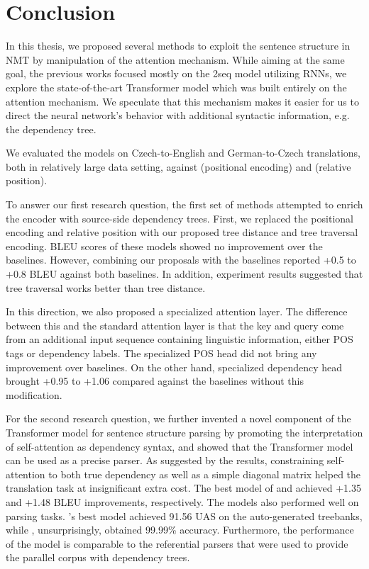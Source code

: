 \chapter{Conclusion}

In this thesis, we proposed several methods to exploit the sentence structure in NMT by manipulation of the attention mechanism.
While aiming at the same goal, the previous works focused mostly on the \seq2seq model utilizing RNNs, we explore the state-of-the-art Transformer model which was built entirely on the attention mechanism.
We speculate that this mechanism makes it easier for us to direct the neural network's behavior with additional syntactic information, e.g. the dependency tree.

We evaluated the models on Czech-to-English and German-to-Czech translations, both in relatively large data setting, against \transformerbase (positional encoding) and \transformerrel (relative position).

To answer our first research question, the first set of methods attempted to enrich the encoder with source-side dependency trees.
First, we replaced the positional encoding and relative position with our proposed tree distance and tree traversal encoding.
BLEU scores of these models showed no improvement over the baselines.
However, combining our proposals with the baselines reported +0.5 to +0.8 BLEU against both baselines.
In addition, experiment results suggested that tree traversal works better than tree distance.

In this direction, we also proposed a specialized attention layer.
The difference between this and the standard attention layer is that the key and query come from an additional input sequence containing linguistic information, either POS tags or dependency labels.
The specialized POS head did not bring any improvement over baselines.
On the other hand, specialized dependency head brought +0.95 to +1.06 compared against the baselines without this modification.

For the second research question, we further invented a novel component of the Transformer model for sentence structure parsing by promoting the interpretation of self-attention as dependency syntax, and showed that the Transformer model can be used as a precise parser.
As suggested by the results, constraining self-attention to both true dependency as well as a simple diagonal matrix helped the translation task at insignificant extra cost.
The best model of \DepParse and \DiagonalParse achieved +1.35 and +1.48 BLEU improvements, respectively. 
The models also performed well on parsing tasks.
\DepParse's best model achieved 91.56 UAS on the auto-generated treebanks, while \DiagonalParse, unsurprisingly, obtained 99.99\% accuracy.
Furthermore, the performance of the \DepParse model is comparable to the referential parsers that were used to provide the parallel corpus with dependency trees.

